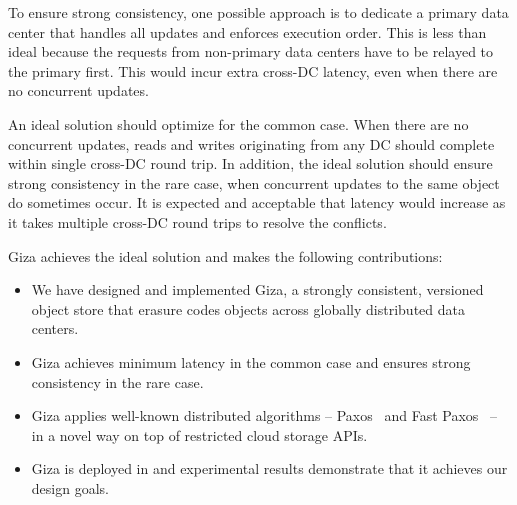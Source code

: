 To ensure strong consistency, one possible approach is to dedicate a primary
data center that handles all updates and enforces execution order. This is less
than ideal because the requests from non-primary data centers have to be relayed
to the primary first. This would incur extra cross-DC latency, even when there are
no concurrent updates.

An ideal solution should optimize for the common case.
When there are no concurrent updates, 
reads and writes originating from any DC should complete within single cross-DC round trip.
In addition, the ideal solution should ensure strong consistency in the rare case,
when concurrent updates to the same object do sometimes occur.
It is expected and acceptable that latency would increase
as it takes multiple cross-DC round trips to resolve the conflicts.

Giza achieves the ideal solution and makes the following contributions:
\begin{itemize}
    \item We have designed and implemented Giza, a strongly consistent,
      versioned object store that erasure codes objects across globally
      distributed data centers.
    \item Giza achieves minimum latency in the common case and ensures strong consistency in the rare case.
    \item Giza applies well-known distributed algorithms -- Paxos~\cite{lamport01paxos}
      and Fast Paxos~\cite{lamport05fast} -- in a novel way on top of restricted cloud storage APIs.
    \item Giza is deployed in \deployment and experimental results demonstrate
      that it achieves our design goals.
\end{itemize}